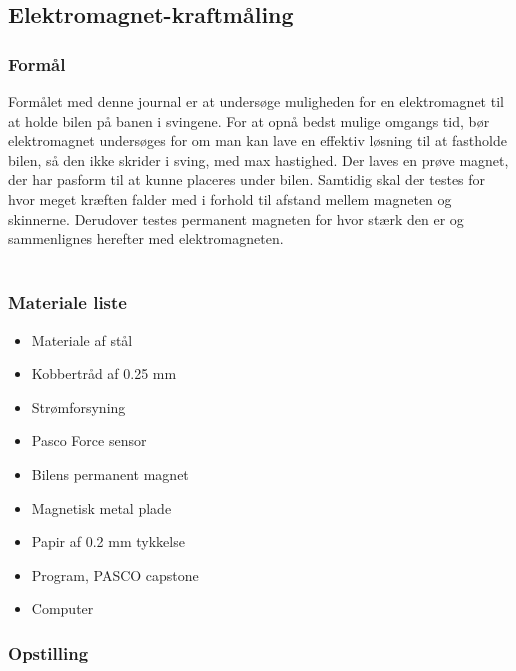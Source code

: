 \newpage 
\subsection{Elektromagnet-kraftmåling}\label{bilag_elektromagnet}
\subsubsection*{Formål}
Formålet med denne journal er at undersøge muligheden for en elektromagnet til at holde bilen på banen i svingene. For at opnå bedst mulige omgangs tid, bør elektromagnet undersøges for om man kan lave en effektiv løsning til at fastholde bilen, så den ikke skrider i sving, med max hastighed. Der laves en prøve magnet, der har pasform til at kunne placeres under bilen. Samtidig skal der testes for hvor meget kræften falder med i forhold til afstand mellem magneten og skinnerne. Derudover testes permanent magneten for hvor stærk den er og sammenlignes herefter med elektromagneten.\\
\\
\subsubsection*{Materiale liste}
\begin{itemize}
	\item Materiale af stål
	\item Kobbertråd af 0.25 mm
	\item Strømforsyning
	\item Pasco Force sensor
	\item Bilens permanent magnet
	\item Magnetisk metal plade
	\item Papir af 0.2 mm tykkelse
	\item Program, PASCO capstone
	\item Computer
\end{itemize}
 
\subsubsection*{Opstilling}

